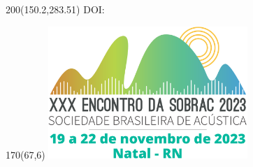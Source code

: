 \pagestyle{plain}
\thispagestyle{firststyle}
\begin{textblock}{200}(150.2,283.51)
\fontsize{8}{8}\selectfont\sffamily 
DOI:~\href{https://doi.org/\DOIArtigo}{\DOIArtigo}
\end{textblock}
\begin{textblock}{170}(67,6)
\includegraphics[height=50mm,page=1]{Sobrac2023.pdf}
\end{textblock}

